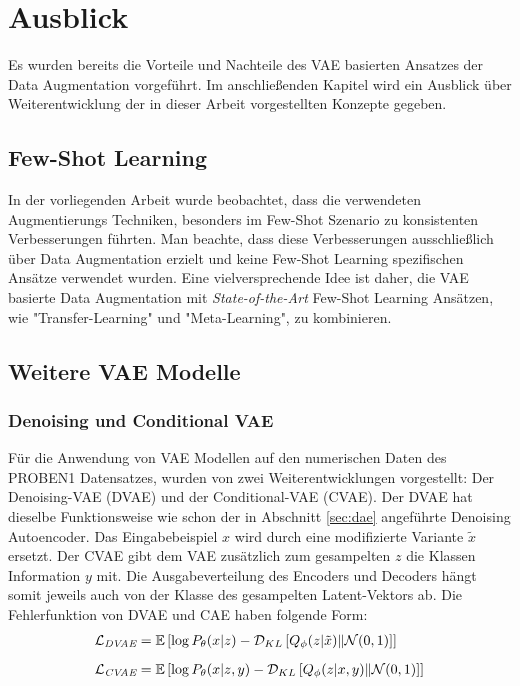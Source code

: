 \chapter{Ausblick}
Es wurden bereits die Vorteile und Nachteile des VAE basierten Ansatzes der Data Augmentation vorgeführt. Im anschließenden Kapitel wird ein Ausblick über Weiterentwicklung der in dieser Arbeit vorgestellten Konzepte gegeben. \\

\section{Few-Shot Learning}
In der vorliegenden Arbeit wurde beobachtet, dass die verwendeten Augmentierungs Techniken, besonders im Few-Shot Szenario zu konsistenten Verbesserungen führten. Man beachte, dass diese Verbesserungen ausschließlich über Data Augmentation erzielt und keine Few-Shot Learning spezifischen Ansätze verwendet wurden. Eine vielversprechende Idee ist daher, die VAE basierte Data Augmentation mit \textit{State-of-the-Art} Few-Shot Learning Ansätzen, wie "Transfer-Learning" und "Meta-Learning", zu kombinieren.


\section{Weitere VAE Modelle}
\subsection{Denoising und Conditional VAE}
Für die Anwendung von VAE Modellen auf den numerischen Daten des PROBEN1 Datensatzes, wurden von \cite{Moreno-Barea2020} zwei Weiterentwicklungen vorgestellt: Der Denoising-VAE (DVAE) und der Conditional-VAE (CVAE). Der DVAE hat dieselbe Funktionsweise wie schon der in Abschnitt \ref{sec:dae} angeführte Denoising Autoencoder. Das Eingabebeispiel $x$ wird durch eine modifizierte Variante $\tilde{x}$ ersetzt. Der CVAE gibt dem VAE zusätzlich zum gesampelten $z$ die Klassen Information $y$ mit. Die Ausgabeverteilung des Encoders und Decoders hängt somit jeweils auch von der Klasse des gesampelten Latent-Vektors ab. Die Fehlerfunktion von DVAE und CAE haben folgende Form:
\begin{align}
  \mathcal{L}_{\textit{DVAE}} &= \mathbb{E} \left[\log P_\theta(x \vert z) - \mathcal{D}_{KL}\left[Q_\phi(z \vert \tilde{x}) \| \mathcal{N}(0, 1)\right] \right] \\[6pt]
  \mathcal{L}_{\textit{CVAE}} &= \mathbb{E} \left[\log P_\theta(x \vert z, y) - \mathcal{D}_{KL}\left[Q_\phi(z \vert x, y) \| \mathcal{N}(0, 1)\right] \right]
\end{align}


